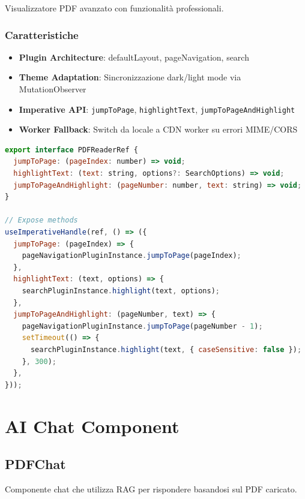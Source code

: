 \documentclass[11pt,a4paper]{article}
\begin{document}
Visualizzatore PDF avanzato con funzionalità professionali.

\subsubsection{Caratteristiche}

\begin{itemize}[leftmargin=*]
    \item \textbf{Plugin Architecture}: defaultLayout, pageNavigation, search
    \item \textbf{Theme Adaptation}: Sincronizzazione dark/light mode via MutationObserver
    \item \textbf{Imperative API}: \texttt{jumpToPage}, \texttt{highlightText}, \texttt{jumpToPageAndHighlight}
    \item \textbf{Worker Fallback}: Switch da locale a CDN worker su errori MIME/CORS
\end{itemize}

\begin{lstlisting}[language=JavaScript, caption={Imperative API Ref}]
export interface PDFReaderRef {
  jumpToPage: (pageIndex: number) => void;
  highlightText: (text: string, options?: SearchOptions) => void;
  jumpToPageAndHighlight: (pageNumber: number, text: string) => void;
}

// Expose methods
useImperativeHandle(ref, () => ({
  jumpToPage: (pageIndex) => {
    pageNavigationPluginInstance.jumpToPage(pageIndex);
  },
  highlightText: (text, options) => {
    searchPluginInstance.highlight(text, options);
  },
  jumpToPageAndHighlight: (pageNumber, text) => {
    pageNavigationPluginInstance.jumpToPage(pageNumber - 1);
    setTimeout(() => {
      searchPluginInstance.highlight(text, { caseSensitive: false });
    }, 300);
  },
}));
\end{lstlisting}

\section{AI Chat Component}

\subsection{PDFChat}

Componente chat che utilizza RAG per rispondere basandosi sul PDF caricato.
\end{document}
